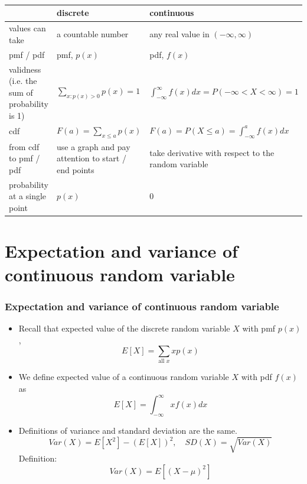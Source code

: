 \documentclass[slidestop,compress,mathserif]{beamer}
\begin{document}
\begin{frame}\frametitle{}

\begin{center}
\begin{tabular}{ |p{1.5in}| p{1.25in}| p{1.25in}|}%
\hline
\vspace{1mm}
&discrete & continuous  \\ \hline
\vspace{1mm}
values can take& a countable number & any real value in $(-\infty, \infty)$ \\ \hline
\vspace{1mm}
pmf / pdf& pmf, $p(x)$ & pdf, $f(x)$  \\ \hline
\vspace{1mm}
validness (i.e. the sum of probability is 1) & $\sum_{x:p(x) > 0} p(x) = 1$ & $\int_{-\infty}^{\infty} f(x)dx = P(-\infty < X < \infty) = 1$ \\ \hline
\vspace{1mm}
cdf & $F(a) = \sum_{x \leq a} p(x)$ & $F(a) = P(X \leq a) = \int_{-\infty}^{a} f(x)dx$ \\ \hline
\vspace{1mm}
from cdf to pmf / pdf & use a graph and pay attention to start / end points & take derivative with respect to the random variable \\ \hline
\vspace{1mm}
probability at a single point & $p(x)$ & 0 \\ \hline
\end{tabular}
\end{center}


\end{frame}



\section{Expectation and variance of continuous random variable}
\begin{frame}\frametitle{Expectation and variance of continuous random variable}

\begin{itemize}
\item Recall that expected value of the discrete random variable $X$ with pmf $p(x)$,
\[E[X] = \sum_{\text{all } x} x p(x)\]


\item We define expected value of a continuous random variable $X$ with pdf $f(x)$ as
\[E[X] = \int_{-\infty}^{\infty} x f(x) dx\]


\item Definitions of variance and standard deviation are the same.
\[Var(X) = E[X^2] - (E[X])^2, \quad SD(X) = \sqrt{Var{(X)}}  \]
Definition: \[Var(X) = E[(X-\mu)^2] \] 
\end{itemize}

\end{frame}
\end{document}
